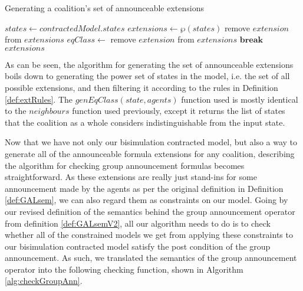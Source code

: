\begin{algorithm}
	\caption{Generating a coalition's set of announceable extensions}
	\label{alg:genAnnExts}
	\begin{algorithmic}
			\State $states \gets contractedModel.states$
			\State $extensions \gets \wp(states)$
					\State remove $extension$ from $extensions$
				\Else
						\State $eqClass \gets $
								\State remove $extension$ from $extensions$
								\State $\mathbf{break}$
							\EndIf
						\EndFor
					\EndFor
				\EndIf				
			\EndFor
			\State \Return $extensions$
		\EndFunction
	\end{algorithmic}
\end{algorithm}

As can be seen, the algorithm for generating the set of announceable extensions boils down to generating the power set of states in the model, i.e. the set of all possible extensions, and then filtering it according to the rules in Definition \ref{def:extRules}. The $genEqClass(state, agents)$ function used is mostly identical to the $neighbours$ function used previously, except it returns the list of states that the coalition as a whole considers indistinguishable from the input state. 

Now that we have not only our bisimulation contracted model, but also a way to generate all of the announceable formula extensions for any coalition, describing the algorithm for checking group announcement formulas becomes straightforward. As these extensions are really just stand-ins for some announcement made by the agents as per the original definition in Definition \ref{def:GALsem}, we can also regard them as constraints on our model. Going by our revised definition of the semantics behind the group announcement operator from definition \ref{def:GALsemV2}, all our algorithm needs to do is to check whether all of the constrained models we get from applying these constraints to our bisimulation contracted model satisfy the post condition of the group announcement. As such, we translated the semantics of the group announcement operator into the following checking function, shown in Algorithm \ref{alg:checkGroupAnn}.

